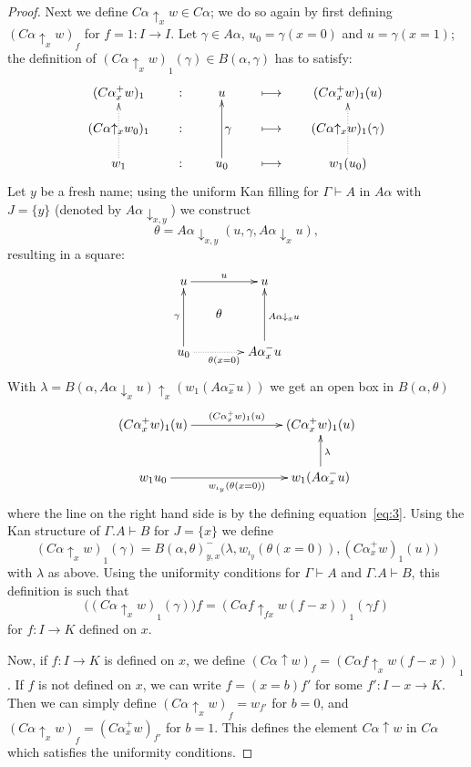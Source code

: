 \documentclass[a4paper,USenglish,draft]{lipics}
\newcommand{\set}[1]{\{#1\}}
\newcommand{\lto}{\longmapsto}
\newcommand{\rup}[1]{#1{\uparrow}}
\newcommand{\rdo}[1]{#1{\downarrow}}
\newcommand{\rupx}[1]{#1{\uparrow_{x}}}
\newcommand{\rdox}[1]{#1{\downarrow_{x}}}
\newcommand{\rdoxy}[1]{#1{\downarrow_{x,y}}}
\newcommand{\del}[1]{}
\begin{document}
\begin{proof}
  Next we define $\rup{C \alpha}_x w \in C \alpha$; we do so again by
  first defining $(\rup{C \alpha}_x w)_f$ for $f = 1 \colon I \to I$.
  Let $\gamma \in A \alpha$, $u_0 = \gamma (x = 0)$ and $u = \gamma
  (x=1)$; the definition of $(\rupx{C\alpha} w)_1 (\gamma) \in
  B(\alpha,\gamma)$ has to satisfy:
  \[
  \xymatrix@R=.4cm@C=.6cm {({C \alpha}^+_x w)_1 &:& u \del{\in
      A\alpha(x=1)} &\lto & ({C \alpha}^+_x w)_1 (u)
    \del{\in B(\alpha(x=1),u)}\\
    (\rupx{C\alpha}w_0)_1 &:& ~~~\gamma\del{\in A\alpha} &\lto &
    (\rupx{C\alpha} w)_1 (\gamma)\del{\in B(\alpha,u)}\\
    w_1\ar@{.>}[uu] &:& u_0\del{\in A\alpha(x=0)}\ar[uu] &\lto &
    w_1 (u_0)\del{\in B(\alpha(x=0),u_0)}\ar@{.>}[uu]\\
  }
  \]
  Let $y$ be a fresh name; using the uniform Kan filling for $\Gamma
  \vdash A$ in $ A \alpha $ with $J = \set {y}$ (denoted by
  $\rdoxy{A\alpha}$) we construct
  \[
  \theta = \rdoxy{A\alpha} {(u, \gamma,\rdox{A\alpha} u)},
  \]
  resulting in a square:
  \[
  \xymatrix@R=.5cm@C=.5cm{
    u \ar[rr]^{u } & & u \\
    & \theta & \\
    u_0 \ar[uu]^\gamma \ar@{.>}[rr]_{\theta(x=0)} & & {A \alpha}^-_x u
    \ar[uu]_{ \rdox{A \alpha} u} }
  \]
  With $\lambda = \rupx {B(\alpha,\rdo{A\alpha}_x u)} (w_1
  (A\alpha^-_x u))$ we get an open box in $B (\alpha , \theta)$
  \[
  \xymatrix@C=2.5cm{ ({C \alpha}^+_x w)_1 (u) \ar[r]^{({C
        \alpha}^+_x w)_1 (u) }& ({C \alpha}^+_x w)_1 (u) \\
    w_1 u_0 \ar[r]_{w_{\iota_y} (\theta (x=0))} & w_1 ({A \alpha}^-_x u)
    \ar[u]_\lambda}
  \]
  where the line on the right hand side is by the defining
  equation~\eqref{eq:3}.  Using the Kan structure of $\Gamma.A\vdash
  B$ for $J=\set{x}$ we define
  \[
  (\rupx{C\alpha}w)_1 (\gamma) =
  {B(\alpha,\theta)}^-_{y,x}\bigl(\lambda, w_{\iota_y} (\theta (x=0)),
  ({C \alpha}^+_x w)_1 (u)\bigr)
  \]
  with $\lambda$ as above.  Using the uniformity conditions for
  $\Gamma \vdash A$ and $\Gamma.A \vdash B$, this definition is such
  that
  \[
  \bigl((\rupx{C\alpha}w)_1 (\gamma)\bigr) f = (\rup{C\alpha f}_{fx} {w
    (f-x)})_1 (\gamma f)
  \]
  for $f \colon I \to K$ defined on $x$.

  Now, if $f:I\to K$ is defined on $x$, we define $(\rup{C\alpha} w)_f
  = (\rupx{C \alpha f} w (f-x))_1$.  If $f$ is not defined on $x$, we
  can write $f=(x=b)f'$ for some $f':I-x \to K$.  Then we can simply
  define $(\rupx{ C\alpha} w)_f = w_{f'}$ for $b=0$, and $(\rupx{
    C\alpha} w)_f = ({C \alpha}^+_x w)_{f'}$ for $b=1$.  This defines
  the element $\rup{C\alpha} w$ in $C \alpha$ which satisfies the
  uniformity conditions.


\end{proof}
\end{document}
